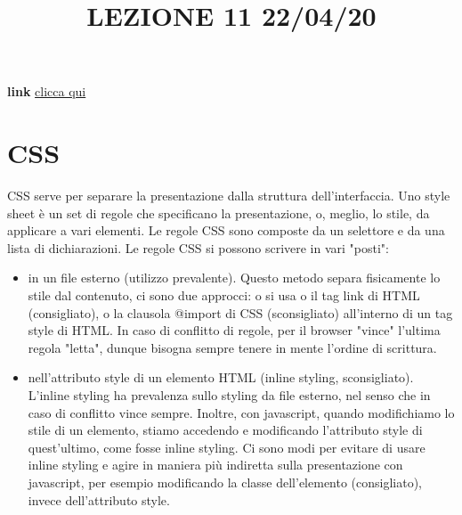 \title{LEZIONE 11 22/04/20}
\textbf{link} \href{https://web.microsoftstream.com/video/fe590834-dff5-4e57-a227-cb5e10913adc?list=user&userId=cfe0965d-9a7c-40e2-be6e-f078296a1914}{clicca qui}
\section{CSS}
CSS serve per separare la presentazione dalla struttura dell'interfaccia.\newline
\newline
Uno style sheet è un set di regole che specificano la presentazione, o, meglio, lo stile, da applicare a vari elementi. Le regole CSS sono composte da un selettore e da una lista di dichiarazioni.\newline
\newline
Le regole CSS si possono scrivere in vari "posti":
\begin{itemize}
    \item in un file esterno (utilizzo prevalente). Questo metodo separa fisicamente lo stile dal contenuto, ci sono due approcci: o si usa o il tag link di HTML (consigliato), o la clausola @import di CSS (sconsigliato) all'interno di un tag style di HTML. In caso di conflitto di regole, per il browser "vince" l'ultima regola "letta", dunque bisogna sempre tenere in mente l'ordine di scrittura.
    \item nell'attributo style di un elemento HTML (inline styling, sconsigliato). L'inline styling ha prevalenza sullo styling da file esterno, nel senso che in caso di conflitto vince sempre. Inoltre, con javascript, quando modifichiamo lo stile di un elemento, stiamo accedendo e modificando l'attributo style di quest'ultimo, come fosse inline styling. Ci sono modi per evitare di usare inline styling e agire in maniera più indiretta sulla presentazione con javascript, per esempio modificando la classe dell'elemento (consigliato), invece dell'attributo style.
\end{itemize}
